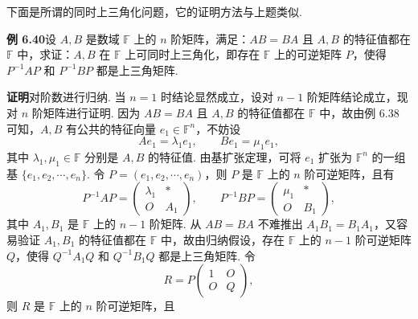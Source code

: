 \documentclass[UTF8,12pt,a4paper,fontset=fandol]{ctexart}
\begin{document}
下面是所谓的同时上三角化问题，它的证明方法与上题类似.

\noindent\textbf{例 6.40}\quad 设 $A,B$ 是数域 $\mathbb{F}$ 上的 $n$ 阶矩阵，满足：$AB=BA$ 且 $A,B$ 的特征值都在 $\mathbb{F}$ 中，求证：$A,B$ 在 $\mathbb{F}$ 上可同时上三角化，即存在 $\mathbb{F}$ 上的可逆矩阵 $P$，使得 $P^{-1}AP$ 和 $P^{-1}BP$ 都是上三角矩阵.

\noindent\textbf{证明}\quad 对阶数进行归纳. 当 $n=1$ 时结论显然成立，设对 $n-1$ 阶矩阵结论成立，现对 $n$ 阶矩阵进行证明. 因为 $AB=BA$ 且 $A,B$ 的特征值都在 $\mathbb{F}$ 中，故由例 6.38 可知，$A,B$ 有公共的特征向量 $e_1\in\mathbb{F}^n$，不妨设
\[
Ae_1=\lambda_1e_1,\qquad Be_1=\mu_1e_1,
\]
其中 $\lambda_1,\mu_1\in\mathbb{F}$ 分别是 $A,B$ 的特征值. 由基扩张定理，可将 $e_1$ 扩张为 $\mathbb{F}^n$ 的一组基 $\{e_1,e_2,\cdots,e_n\}$. 令 $P=(e_1,e_2,\cdots,e_n)$，则 $P$ 是 $\mathbb{F}$ 上的 $n$ 阶可逆矩阵，且有
\[
P^{-1}AP=\left(\begin{array}{cc}
\lambda_1 & *\\
O & A_1
\end{array}\right),\qquad
P^{-1}BP=\left(\begin{array}{cc}
\mu_1 & *\\
O & B_1
\end{array}\right),
\]
其中 $A_1,B_1$ 是 $\mathbb{F}$ 上的 $n-1$ 阶矩阵. 从 $AB=BA$ 不难推出 $A_1B_1=B_1A_1$，又容易验证 $A_1,B_1$ 的特征值都在 $\mathbb{F}$ 中，故由归纳假设，存在 $\mathbb{F}$ 上的 $n-1$ 阶可逆矩阵 $Q$，使得 $Q^{-1}A_1Q$ 和 $Q^{-1}B_1Q$ 都是上三角矩阵. 令
\[
R=P\left(\begin{array}{cc}
1 & O\\
O & Q
\end{array}\right),
\]
则 $R$ 是 $\mathbb{F}$ 上的 $n$ 阶可逆矩阵，且
\end{document}

